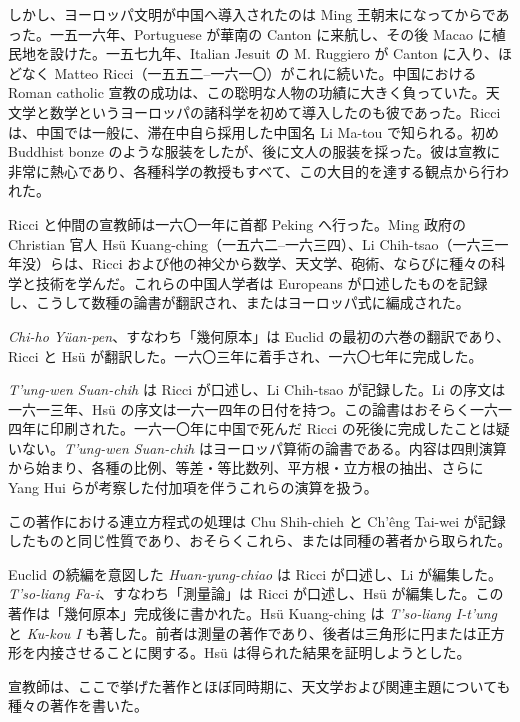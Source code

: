 \documentclass[11pt]{article}
\newcommand{\scanpage}[2]{\clearpage\setcounter{footnote}{0}\noindent{\footnotesize\color{gray}PDF #1 頁 · #2}\par\medskip}
\newcommand{\scanfooter}{}
\begin{document}
しかし、ヨーロッパ文明が中国へ導入されたのは Ming 王朝末になってからであった。一五一六年、Portuguese が華南の Canton に来航し、その後 Macao に植民地を設けた。一五七九年、Italian Jesuit の M. Ruggiero が Canton に入り、ほどなく Matteo Ricci（一五五二--一六一〇）がこれに続いた。中国における Roman catholic 宣教の成功は、この聡明な人物の功績に大きく負っていた。天文学と数学というヨーロッパの諸科学を初めて導入したのも彼であった。Ricci は、中国では一般に、滞在中自ら採用した中国名 Li Ma-tou で知られる。初め Buddhist bonze のような服装をしたが、後に文人の服装を採った。彼は宣教に非常に熱心であり、各種科学の教授もすべて、この大目的を達する観点から行われた。

Ricci と仲間の宣教師は一六〇一年に首都 Peking へ行った。Ming 政府の Christian 官人 Hsü Kuang-ching（一五六二--一六三四）、Li Chih-tsao（一六三一年没）らは、Ricci および他の神父から数学、天文学、砲術、ならびに種々の科学と技術を学んだ。これらの中国人学者は Europeans が口述したものを記録し、こうして数種の論書が翻訳され、またはヨーロッパ式に編成された。

\emph{Chi-ho Yüan-pen}、すなわち「幾何原本」は Euclid の最初の六巻の翻訳であり、Ricci と Hsü が翻訳した。一六〇三年に着手され、一六〇七年に完成した。

\emph{T'ung-wen Suan-chih} は Ricci が口述し、Li Chih-tsao が記録した。Li の序文は一六一三年、Hsü の序文は一六一四年の日付を持つ。この論書はおそらく一六一四年に印刷された。一六一〇年に中国で死んだ Ricci の死後に完成したことは疑いない。\emph{T'ung-wen Suan-chih} はヨーロッパ算術の論書である。内容は四則演算から始まり、各種の比例、等差・等比数列、平方根・立方根の抽出、さらに Yang Hui らが考察した付加項を伴うこれらの演算を扱う。
\scanfooter

\scanpage{0128}{第17章、印刷頁114}
\setcounter{footnote}{0}
この著作における連立方程式の処理は Chu Shih-chieh と Ch'êng Tai-wei が記録したものと同じ性質であり、おそらくこれら、または同種の著者から取られた。

Euclid の続編を意図した \emph{Huan-yung-chiao} は Ricci が口述し、Li が編集した。\emph{T'so-liang Fa-i}、すなわち「測量論」は Ricci が口述し、Hsü が編集した。この著作は「幾何原本」完成後に書かれた。Hsü Kuang-ching は \emph{T'so-liang I-t'ung} と \emph{Ku-kou I} も著した。前者は測量の著作であり、後者は三角形に円または正方形を内接させることに関する。Hsü は得られた結果を証明しようとした。

宣教師は、ここで挙げた著作とほぼ同時期に、天文学および関連主題についても種々の著作を書いた。
\end{document}

